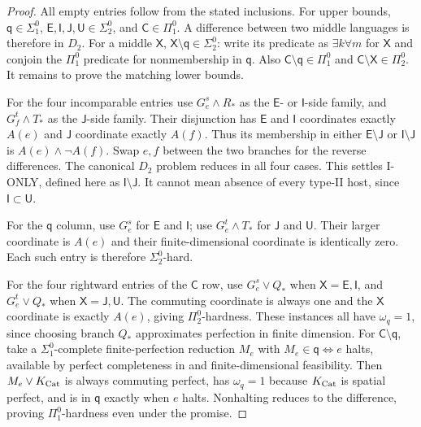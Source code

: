 \begin{proof}
All empty entries follow from the stated inclusions. For upper bounds,
$\mathsf q\in\Sigma^0_1$, $\mathsf E,\mathsf I,\mathsf J,\mathsf U
\in\Sigma^0_2$, and $\mathsf C\in\Pi^0_1$.
A difference between two middle languages is therefore in $D_2$.
For a middle $\mathsf X$, $\mathsf X\setminus\mathsf q\in\Sigma^0_2$:
write its predicate as $\exists k\forall m$ for $\mathsf X$ and
conjoin the $\Pi^0_1$ predicate for nonmembership in $\mathsf q$.
Also $\mathsf C\setminus\mathsf q\in\Pi^0_1$ and
$\mathsf C\setminus\mathsf X\in\Pi^0_2$.
It remains to prove the matching lower bounds.

For the four incomparable entries use
$G^s_e\wedge R_*$ as the $\mathsf E$- or $\mathsf I$-side family,
and $G^t_f\wedge T_*$ as the $\mathsf J$-side family.
Their disjunction has $\mathsf E$ and $\mathsf I$ coordinates
exactly $A(e)$ and $\mathsf J$ coordinate exactly $A(f)$.
Thus its membership in either $\mathsf E\setminus\mathsf J$ or
$\mathsf I\setminus\mathsf J$ is $A(e)\wedge\neg A(f)$.
Swap $e,f$ between the two branches for the reverse differences.
The canonical $D_2$ problem reduces in all four cases.
This settles I-ONLY, defined here as $\mathsf I\setminus\mathsf J$.
It cannot mean absence of every type-II host, since
$\mathsf I\subset\mathsf U$.

For the $\mathsf q$ column, use $G^s_e$ for $\mathsf E$ and
$\mathsf I$; use $G^t_e\wedge T_*$ for $\mathsf J$ and
$\mathsf U$. Their larger coordinate is $A(e)$ and their
finite-dimensional coordinate is identically zero. Each such entry
is therefore $\Sigma^0_2$-hard.

For the four rightward entries of the $\mathsf C$ row, use
$G^s_e\vee Q_*$ when $\mathsf X=\mathsf E,\mathsf I$, and
$G^t_e\vee Q_*$ when $\mathsf X=\mathsf J,\mathsf U$.
The commuting coordinate is always one and the $\mathsf X$
coordinate is exactly $A(e)$, giving $\Pi^0_2$-hardness.
These instances all have $\omega_q=1$, since choosing branch $Q_*$
approximates perfection in finite dimension.
For $\mathsf C\setminus\mathsf q$, take a $\Sigma^0_1$-complete
finite-perfection reduction $M_e$ with
$M_e\in\mathsf q\iff e$ halts, available by perfect completeness
in \cite[Theorem 12.6]{MIPRE} and finite-dimensional feasibility.
Then $M_e\vee K_{\operatorname{Cat}}$ is always commuting perfect, has
$\omega_q=1$ because $K_{\operatorname{Cat}}$ is spatial perfect, and is in
$\mathsf q$ exactly when $e$ halts. Nonhalting reduces to the
difference, proving $\Pi^0_1$-hardness even under the promise.


\end{proof}

